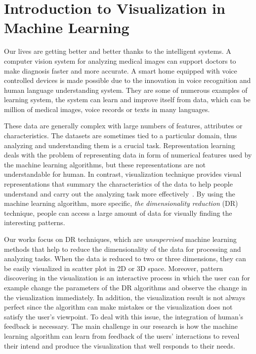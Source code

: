 \section{Introduction to Visualization in Machine Learning}

Our lives are getting better and better thanks to the intelligent systems.
A computer vision system for analyzing medical images can support doctors to make diagnosis faster and more accurate.
A smart home equipped with voice controlled devices is made possible due to the innovation in voice recognition and human language understanding system.
They are some of numerous examples of learning system, the system can learn and improve itself from data, which can be million of medical images, voice records or texts in many languages.

These data are generally complex with large numbers of features, attributes or characteristics.
The datasets are sometimes tied to a particular domain, thus analyzing and understanding them is a crucial task.
Representation learning~\cite{bengio2013representation} deals with the problem of representing data in form of numerical features used by the machine learning algorithms, but these representations are not understandable for human.
In contrast, visualization technique provides visual representations that summary the characteristics of the data to help people understand and carry out the analyzing task more effectively~\cite{munzner2014visualization}.
By using the machine learning algorithm, more specific, \emph{the dimensionality reduction} (DR) technique, people can access a large amount of data for visually finding the interesting patterns.

Our works focus on DR techniques, which are \emph{unsupervised} machine learning methods that help to reduce the dimensionality of the data for processing and analyzing tasks.
When the data is reduced to two or three dimensions, they can be easily visualized in scatter plot in 2D or 3D space.
Moreover, pattern discovering in the visualization is an interactive process in which the user can for example change the parameters of the DR algorithms and observe the change in the visualization immediately.
In addition, the visualization result is not always perfect since the algorithm can make mistakes or the visualization does not satisfy the user's viewpoint. To deal with this issue, the integration of human's feedback is necessary.
The main challenge in our research is how the machine learning algorithm can learn from feedback of the users' interactions to reveal their intend and produce the visualization that well responds to their needs.


